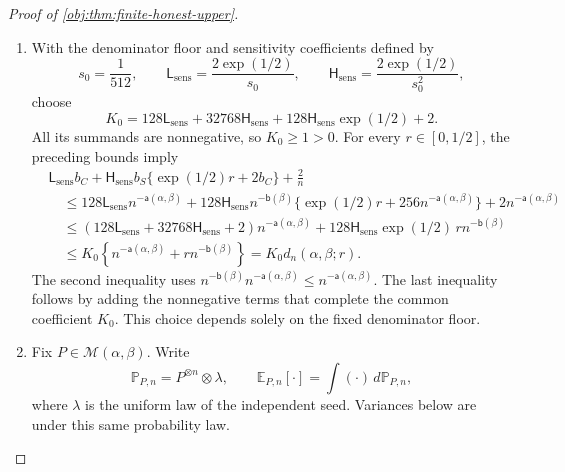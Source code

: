 \begin{proof}[Proof of \cref{obj:thm:finite-honest-upper}]
\begin{enumerate}
\item With the denominator floor and sensitivity coefficients defined by
\[
s_0=\frac1{512},
\qquad
\mathsf L_{\mathrm{sens}}=\frac{2\exp(1/2)}{s_0},
\qquad
\mathsf H_{\mathrm{sens}}=\frac{2\exp(1/2)}{s_0^2},
\]
choose
\[
K_0
=
128\mathsf L_{\mathrm{sens}}
+32768\mathsf H_{\mathrm{sens}}
+128\mathsf H_{\mathrm{sens}}\exp(1/2)+2.
\]
All its summands are nonnegative, so \(K_0\ge1>0\).
For every \(r\in[0,1/2]\), the preceding bounds imply
\[
\begin{aligned}
&\mathsf L_{\mathrm{sens}}b_C
+\mathsf H_{\mathrm{sens}}b_S
   \{\exp(1/2)r+2b_C\}
+\frac2n\\
&\quad\le
128\mathsf L_{\mathrm{sens}}n^{-\mathsf a(\alpha,\beta)}
+128\mathsf H_{\mathrm{sens}}n^{-\mathsf b(\beta)}
 \{\exp(1/2)r+256n^{-\mathsf a(\alpha,\beta)}\}
+2n^{-\mathsf a(\alpha,\beta)}\\
&\quad\le
(128\mathsf L_{\mathrm{sens}}
 +32768\mathsf H_{\mathrm{sens}}+2)
 n^{-\mathsf a(\alpha,\beta)}
+
128\mathsf H_{\mathrm{sens}}\exp(1/2)\,
r n^{-\mathsf b(\beta)}\\
&\quad\le
K_0\left\{
n^{-\mathsf a(\alpha,\beta)}
+r n^{-\mathsf b(\beta)}
\right\}
=
K_0d_n(\alpha,\beta;r).
\end{aligned}
\]
The second inequality uses
\(n^{-\mathsf b(\beta)}n^{-\mathsf a(\alpha,\beta)}
\le n^{-\mathsf a(\alpha,\beta)}\).
The last inequality follows by adding the nonnegative terms that complete the common coefficient \(K_0\).
This choice depends solely on the fixed denominator floor.

\item Fix \(P\in\mathcal M(\alpha,\beta)\). Write
\[
\mathbb P_{P,n}=P^{\otimes n}\otimes\lambda,
\qquad
\mathbb E_{P,n}[\cdot]=\int(\cdot)\,d\mathbb P_{P,n},
\]
where \(\lambda\) is the uniform law of the independent seed. Variances below are under this same probability law.


\end{enumerate}
\end{proof}
